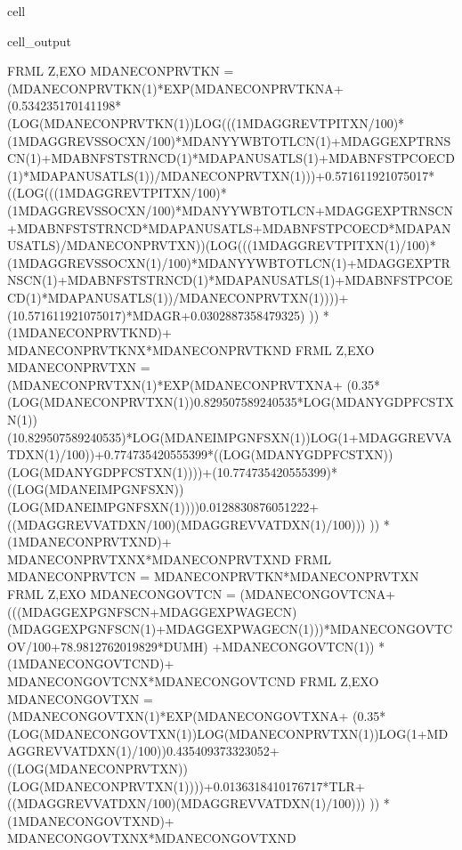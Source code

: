 \documentclass[letterpaper,10pt,english]{jupyterBook}
\begin{document}
\begin{sphinxuseclass}{cell}
\begin{sphinxVerbatimOutput}
\begin{sphinxuseclass}{cell_output}
\begin{sphinxVerbatim}[commandchars=\\\{\}]
FRML \PYGZlt{}Z,EXO\PYGZgt{} MDANECONPRVTKN = (MDANECONPRVTKN(\PYGZhy{}1)*EXP(MDANECONPRVTKN\PYGZus{}A+ (\PYGZhy{}0.534235170141198*(LOG(MDANECONPRVTKN(\PYGZhy{}1))\PYGZhy{}LOG(((1\PYGZhy{}MDAGGREVTPITXN/100)*(1\PYGZhy{}MDAGGREVSSOCXN/100)*MDANYYWBTOTLCN(\PYGZhy{}1)+MDAGGEXPTRNSCN(\PYGZhy{}1)+MDABNFSTSTRNCD(\PYGZhy{}1)*MDAPANUSATLS(\PYGZhy{}1)+MDABNFSTPCOECD(\PYGZhy{}1)*MDAPANUSATLS(\PYGZhy{}1))/MDANECONPRVTXN(\PYGZhy{}1)))+0.571611921075017*((LOG(((1\PYGZhy{}MDAGGREVTPITXN/100)*(1\PYGZhy{}MDAGGREVSSOCXN/100)*MDANYYWBTOTLCN+MDAGGEXPTRNSCN+MDABNFSTSTRNCD*MDAPANUSATLS+MDABNFSTPCOECD*MDAPANUSATLS)/MDANECONPRVTXN))\PYGZhy{}(LOG(((1\PYGZhy{}MDAGGREVTPITXN(\PYGZhy{}1)/100)*(1\PYGZhy{}MDAGGREVSSOCXN(\PYGZhy{}1)/100)*MDANYYWBTOTLCN(\PYGZhy{}1)+MDAGGEXPTRNSCN(\PYGZhy{}1)+MDABNFSTSTRNCD(\PYGZhy{}1)*MDAPANUSATLS(\PYGZhy{}1)+MDABNFSTPCOECD(\PYGZhy{}1)*MDAPANUSATLS(\PYGZhy{}1))/MDANECONPRVTXN(\PYGZhy{}1))))+(1\PYGZhy{}0.571611921075017)*MDAGR+0.0302887358479325) )) * (1\PYGZhy{}MDANECONPRVTKN\PYGZus{}D)+ MDANECONPRVTKN\PYGZus{}X*MDANECONPRVTKN\PYGZus{}D  \PYGZdl{}
FRML \PYGZlt{}Z,EXO\PYGZgt{} MDANECONPRVTXN = (MDANECONPRVTXN(\PYGZhy{}1)*EXP(MDANECONPRVTXN\PYGZus{}A+ (\PYGZhy{}0.35*(LOG(MDANECONPRVTXN(\PYGZhy{}1))\PYGZhy{}0.829507589240535*LOG(MDANYGDPFCSTXN(\PYGZhy{}1))\PYGZhy{}(1\PYGZhy{}0.829507589240535)*LOG(MDANEIMPGNFSXN(\PYGZhy{}1))\PYGZhy{}LOG(1+MDAGGREVVATDXN(\PYGZhy{}1)/100))+0.774735420555399*((LOG(MDANYGDPFCSTXN))\PYGZhy{}(LOG(MDANYGDPFCSTXN(\PYGZhy{}1))))+(1\PYGZhy{}0.774735420555399)*((LOG(MDANEIMPGNFSXN))\PYGZhy{}(LOG(MDANEIMPGNFSXN(\PYGZhy{}1))))\PYGZhy{}0.0128830876051222+((MDAGGREVVATDXN/100)\PYGZhy{}(MDAGGREVVATDXN(\PYGZhy{}1)/100))) )) * (1\PYGZhy{}MDANECONPRVTXN\PYGZus{}D)+ MDANECONPRVTXN\PYGZus{}X*MDANECONPRVTXN\PYGZus{}D  \PYGZdl{}
FRML  \PYGZlt{}\PYGZgt{} MDANECONPRVTCN = MDANECONPRVTKN*MDANECONPRVTXN \PYGZdl{}
FRML \PYGZlt{}Z,EXO\PYGZgt{} MDANECONGOVTCN = (MDANECONGOVTCN\PYGZus{}A+ (((MDAGGEXPGNFSCN+MDAGGEXPWAGECN)\PYGZhy{}(MDAGGEXPGNFSCN(\PYGZhy{}1)+MDAGGEXPWAGECN(\PYGZhy{}1)))*MDANECONGOVTCOV\PYGZus{}/100+78.9812762019829*DUMH) +MDANECONGOVTCN(\PYGZhy{}1)) * (1\PYGZhy{}MDANECONGOVTCN\PYGZus{}D)+ MDANECONGOVTCN\PYGZus{}X*MDANECONGOVTCN\PYGZus{}D  \PYGZdl{}
FRML \PYGZlt{}Z,EXO\PYGZgt{} MDANECONGOVTXN = (MDANECONGOVTXN(\PYGZhy{}1)*EXP(MDANECONGOVTXN\PYGZus{}A+ (\PYGZhy{}0.35*(LOG(MDANECONGOVTXN(\PYGZhy{}1))\PYGZhy{}LOG(MDANECONPRVTXN(\PYGZhy{}1))\PYGZhy{}LOG(1+MDAGGREVVATDXN(\PYGZhy{}1)/100))\PYGZhy{}0.435409373323052+((LOG(MDANECONPRVTXN))\PYGZhy{}(LOG(MDANECONPRVTXN(\PYGZhy{}1))))+0.0136318410176717*T\PYGZus{}LR+((MDAGGREVVATDXN/100)\PYGZhy{}(MDAGGREVVATDXN(\PYGZhy{}1)/100))) )) * (1\PYGZhy{}MDANECONGOVTXN\PYGZus{}D)+ MDANECONGOVTXN\PYGZus{}X*MDANECONGOVTXN\PYGZus{}D  \PYGZdl{}

\end{sphinxVerbatim}
\end{sphinxuseclass}
\end{sphinxVerbatimOutput}
\end{sphinxuseclass}
\end{document}
